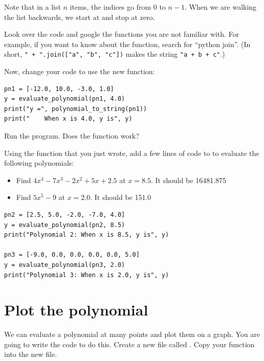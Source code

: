 Note that in a list $n$ items, the indices go from 0 to $n-1$. When
we are walking the list backwards, we start at  and stop at zero.

Look over the code and google the functions you are not familiar
with. For example, if you want to know about the 
function, search for ``python join''. (In short,
\texttt{" + ".join(["a", "b", "c"])} makes the string
\texttt{"a + b + c"}.)

Now, change your code to use the new function:
\begin{verbatim}
pn1 = [-12.0, 10.0, -3.0, 1.0]
y = evaluate_polynomial(pn1, 4.0)
print("y =", polynomial_to_string(pn1))
print("    When x is 4.0, y is", y)
\end{verbatim}

Run the program. Does the function work?

\begin{Exercise}[title={Evaluate Polynomials}, label=pyevalpolynomials]
Using the function that you just wrote, add a few lines of code to
 to evaluate the following polynomials:
\begin{itemize}
\item Find $4x^4 - 7x^3 - 2x^2 + 5x + 2.5$ at $x = 8.5$.  It should be 16481.875
\item Find $5x^5 - 9$ at $x = 2.0$.  It should be 151.0
\end{itemize}
\end{Exercise}
\begin{Answer}[ref=pyevalpolynomials]
\begin{verbatim}
pn2 = [2.5, 5.0, -2.0, -7.0, 4.0]
y = evaluate_polynomial(pn2, 8.5)
print("Polynomial 2: When x is 8.5, y is", y)

pn3 = [-9.0, 0.0, 0.0, 0.0, 0.0, 5.0]
y = evaluate_polynomial(pn3, 2.0)
print("Polynomial 3: When x is 2.0, y is", y)    
\end{verbatim} 
\end{Answer}

\section{Plot the polynomial}

We can evaluate a polynomial at many points and plot them on a
graph. You are going to write the code to do this.  Create a new file
called . Copy your 
function into the new file.

